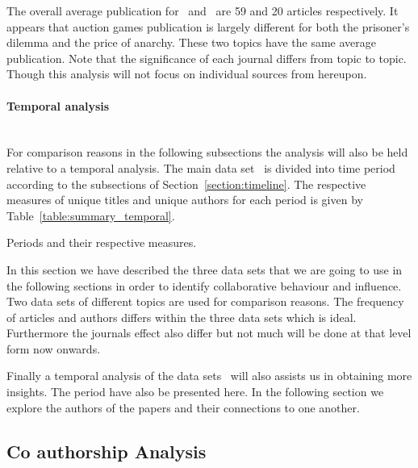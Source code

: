 \documentclass{article}
\theoremstyle{definition}
\begin{document}
The overall average publication for~\cite{} and~\cite{} are 59 and 20 articles
respectively. It appears that auction games publication is largely different
for both the prisoner's dilemma and the price of anarchy. These two topics have
the same average publication. Note that the significance of each journal differs
from topic to topic. Though this analysis will not focus on individual sources
from hereupon.

\paragraph{Temporal analysis}
\mbox{ }\\

For comparison reasons in the following subsections the analysis will also be
held relative to a temporal analysis. The main data set~\cite{}
is divided into time period according to the subsections of Section~\ref{section:timeline}.
The respective measures of unique titles and unique authors for each period is
given by Table~\ref{table:summary_temporal}.

\begin{table}[!hbtp]
    \begin{center}
    
    \end{center}
    \caption{Periods and their respective measures.}
    \label{table:summary_temporal}
\end{table}

In this section we have described the three data sets that we are going to use
in the following sections in order to identify collaborative behaviour and influence.
Two data sets of different topics are used for comparison reasons. The frequency of
articles and authors differs within the three data sets which is ideal. Furthermore
the journals effect also differ but not much will be done at that level form now
onwards.

Finally a temporal analysis of the data sets~\cite{} will also assists us in
obtaining more insights. The period have also be presented here.
In the following section we explore the authors of the papers and their
connections to one another.

\subsection{Co authorship Analysis}

\end{document}

